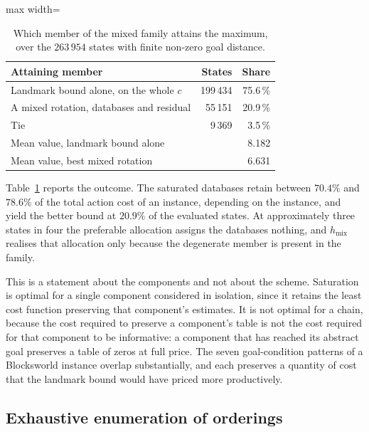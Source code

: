 \documentclass[10pt,twocolumn,a4paper]{article}
\theoremstyle{plain}
\theoremstyle{definition}
\theoremstyle{remark}
\begin{document}
\begin{table}[t]
\centering
\caption{Which member of the mixed family attains the maximum, over the
$263\,954$ states with finite non-zero goal distance.}
\label{tab:anatomy}
\small
\begin{adjustbox}{max width=\columnwidth}
\begin{tabular}{lrr}
\toprule
Attaining member & States & Share \\
\midrule
Landmark bound alone, on the whole $c$ & 199\,434 & 75.6\,\% \\
A mixed rotation, databases and residual & 55\,151 & 20.9\,\% \\
Tie & 9\,369 & 3.5\,\% \\
\midrule
\multicolumn{2}{l}{Mean value, landmark bound alone} & 8.182 \\
\multicolumn{2}{l}{Mean value, best mixed rotation}  & 6.631 \\
\bottomrule
\end{tabular}
\end{adjustbox}
\end{table}

Table~\ref{tab:anatomy} reports the outcome. The saturated databases retain
between $70.4\%$ and $78.6\%$ of the total action cost of an instance,
depending on the instance, and yield the better bound at $20.9\%$ of the
evaluated states. At approximately three states in four the preferable
allocation assigns the databases nothing, and $h_{\mathrm{mix}}$ realises that
allocation only because the degenerate member is present in the family.

This is a statement about the components and not about the scheme. Saturation
is optimal for a single component considered in isolation, since it retains the
least cost function preserving that component's estimates. It is not optimal
for a chain, because the cost required to preserve a component's table is not
the cost required for that component to be informative: a component that has
reached its abstract goal preserves a table of zeros at full price. The seven
goal-condition patterns of a Blocksworld instance overlap substantially, and
each preserves a quantity of cost that the landmark bound would have priced
more productively.

\subsection{Exhaustive enumeration of orderings}
\label{sec:orders}
\end{document}
